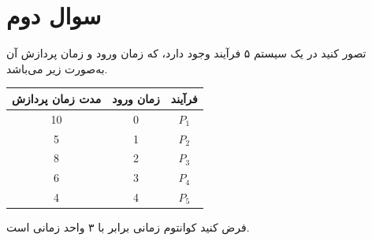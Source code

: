 \section{سوال دوم}

تصور کنید در یک سیستم ۵ فرآیند وجود دارد، که زمان ورود  و زمان پردازش  آن به‌صورت زیر می‌باشد.


\begin{center}
	\begin{tabular}{||c|c|c||}
		\hline 
		مدت زمان پردازش & زمان ورود & فرآیند \\
		\hline \hline
		10 & 0 & $P_1$ \\
		5 & 1 & $P_2$ \\
		8 & 2 & $P_3$ \\
		6 & 3 & $P_4$ \\
		4 & 4 & $P_5$ \\
		\hline
	\end{tabular}
\end{center}



فرض کنید کوانتوم زمانی برابر با ۳ واحد زمانی است.

